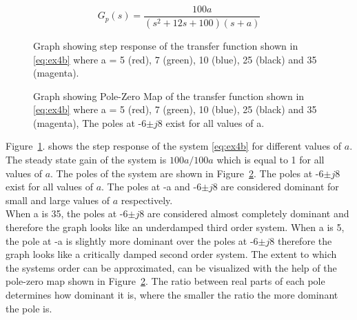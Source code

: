 \renewcommand{\ex}{ex4b} 

\begin{equation}
	G_{p}\left(s\right)=\frac{100a}{\left(s^2 + 12s + 100\right)\left(s+a\right)}
	\label{eq:\ex}
\end{equation}

\begin{figure}[ht!]
    \centering
    
    \caption{Graph showing step response of the transfer function shown in \eqref{eq:\ex} where a = 5 (red), 7 (green), 10 (blue), 25 (black) and 35 (magenta). \appendixamble{\ex}}
    \label{fig:\ex}
\end{figure}\FloatBarrier

\begin{figure}[ht!]
    \centering
    
    \caption{Graph showing Pole-Zero Map of the transfer function shown in \eqref{eq:\ex} where a = 5 (red), 7 (green), 10 (blue), 25 (black) and 35 (magenta), The poles at -6$\pm j8$ exist for all values of a. \appendixamble{\ex}}
    \label{fig:\ex_2}
\end{figure}\FloatBarrier

Figure~\ref{fig:\ex}. shows the step response of the system \eqref{eq:\ex} for different values of $a$. The steady state gain of the system is $100a/100a$ which is equal to 1 for all values of $a$. The poles of the system are shown in Figure~\ref{fig:\ex_2}. The poles at -6$\pm j8$ exist for all values of $a$. The poles at -a and -6$\pm j8$ are considered dominant for small and large values of $a$ respectively. \\

When a is 35, the poles at -6$\pm j8$ are considered almost completely dominant and therefore the graph looks like an underdamped third order system. When a is 5, the pole at -a is slightly more dominant over the poles at -6$\pm j8$ therefore the graph looks like a critically damped second order system. The extent to which the systems order can be approximated, can be visualized with the help of the pole-zero map shown in Figure~\ref{fig:\ex_2}. The ratio between real parts of each pole determines how dominant it is, where the smaller the ratio the more dominant the pole is. 
